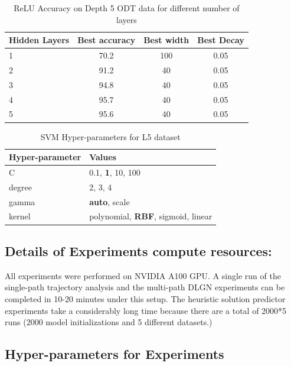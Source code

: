 \documentclass{article}
\theoremstyle{plain}
\theoremstyle{definition}
\theoremstyle{remark}
\newcommand{\1}{{\mathbf 1}}
\newcommand{\0}{{\mathbf 0}}
\renewcommand{\>}{{\rightarrow}}
\begin{document}
\begin{table}[h]
    \centering
    \caption{ReLU Accuracy on Depth 5 ODT data for different number of layers}    
    \begin{tabular}{|l|c|c|c|}
    \hline
    Hidden Layers & Best accuracy & Best width & Best Decay  \\     \hline
    1 & 70.2 & 100 & 0.05 \\     \hline
    2 & 91.2 & 40 & 0.05 \\         \hline
    3 & 94.8 & 40 & 0.05 \\     \hline
    4 & 95.7 & 40 & 0.05 \\    \hline        
    5 & 95.6 & 40 & 0.05  \\     \hline
    \end{tabular}
    \label{tab:relu5a_details}
\end{table}

\begin{table}[h]
\centering
\caption{SVM Hyper-parameters for L5 dataset}
\begin{tabular}{|l|l|}
\hline
\textbf{Hyper-parameter} & \textbf{Values} \\ \hline
C & 0.1, \textbf{1}, 10, 100 \\ 
degree & 2, 3, 4 \\ 
gamma & \textbf{auto}, scale \\ 
kernel & polynomial, \textbf{RBF}, sigmoid, linear \\ \hline
\end{tabular}
\label{tab:svm5a}
\end{table}

\subsection{Details of Experiments compute resources:}
All experiments were performed on NVIDIA A100 GPU. A single run of the single-path trajectory analysis and the multi-path DLGN experiments can be completed in 10-20 minutes under this setup. The heuristic solution predictor experiments take a considerably long time because there are a total of 2000*5 runs (2000 model initializations and 5 different datasets.)

\newpage
\subsection{Hyper-parameters for Experiments}
\end{document}
